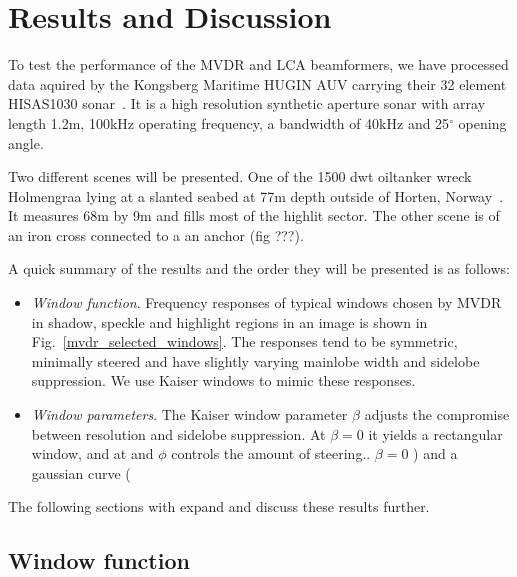\documentclass[10pt,journal,draftclsnofoot,onecolumn]{IEEEtran}
\newcommand\Fig[1]{Fig.~\ref{#1}}
\newcommand\1{\vec 1}
\begin{document}





\newpage
\section{Results and Discussion}


To test the performance of the MVDR and LCA beamformers, we have processed data aquired by the Kongsberg Maritime HUGIN AUV carrying their 32 element HISAS1030 sonar~\cite{Hansen2009}. It is a high resolution synthetic aperture sonar with array length 1.2\;m, 100\;kHz operating frequency, a bandwidth of 40\;kHz and 25$^\circ$ opening angle.

Two different scenes will be presented. One of the 1500 dwt oiltanker wreck Holmengraa lying at a slanted seabed at 77\;m depth outside of Horten, Norway~\cite{holmengraa}. It measures 68\;m by 9\;m and fills most of the highlit sector. The other scene is of an iron cross connected to a an anchor (fig ???).

A quick summary of the results and the order they will be presented is as follows:

\begin{itemize}
\item \emph{Window function}. Frequency responses of typical windows chosen by MVDR in shadow, speckle and highlight regions in an image is shown in \Fig{mvdr_selected_windows}. The responses tend to be symmetric, minimally steered and have slightly varying mainlobe width and sidelobe suppression. We use Kaiser windows to mimic these responses.
\item \emph{Window parameters}. The Kaiser window parameter $\beta$ adjusts the compromise between resolution and sidelobe suppression. At $\beta=0$ it yields a rectangular window, and at and $\phi$ controls the amount of steering.. $\beta=0$ ) and a gaussian curve (
\end{itemize}

The following sections with expand and discuss these results further.

\subsection{Window function}
\end{document}
